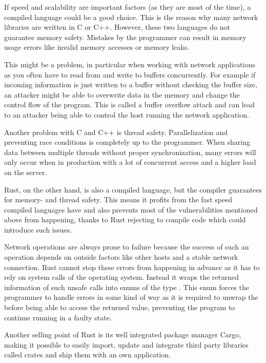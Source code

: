 If speed and scalability are important factors (as they are most of the time), a compiled language could be a good
choice. This is the reason why many network libraries are written in C or C++. However, these two languages do not
guarantee memory safety. Mistakes by the programmer can result in memory usage errors like invalid memory accesses or
memory leaks.

This might be a problem, in particular when working with network applications as you often have to read from and write
to buffers concurrently. For example if incoming information is just written to a buffer without checking the buffer
size, an attacker might be able to overwrite data in the memory and change the control flow of the program. This is
called a buffer overflow attack and can lead to an attacker being able to control the host running the network
application. \cite{c00buffer}

Another problem with C and C++ is thread safety. Parallelization and preventing race conditions is completely up to the
programmer. When sharing data between multiple threads without proper synchronization, many errors will only occur when
in production with a lot of concurrent access and a higher load on the server.

Rust, on the other hand, is also a compiled language, but the compiler guarantees for memory- and thread safety. This
means it profits from the fast speed compiled languages have and also prevents most of the vulnerabilities mentioned
above from happening, thanks to Rust rejecting to compile code which could introduce such issues.

Network operations are always prone to failure because the success of such an operation depends on outside factors like
other hosts and a stable network connection. Rust cannot stop these errors from happening in advance as it has to rely
on system calls of the operating system. Instead it wraps the returned information of such unsafe calls into enums of
the type . This enum forces the programmer to handle errors in some kind of way as it is
required to unwrap the  before being able to access the returned value, preventing the program to continue
running in a faulty state.

Another selling point of Rust is its well integrated package manager Cargo, making it possible to easily import, update
and integrate third party libraries called crates and ship them with an own application.

